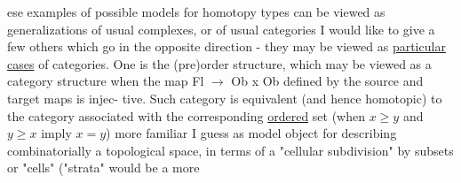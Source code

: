   ese examples of possible models for homotopy types can be viewed
as generalizations of usual complexes,  or of usual categories  I would
like to give a few others which go in the opposite direction  -  they
may be viewed as  \uline{particular cases} of categories.  One is the (pre)order
structure,  which may be viewed as a category structure when the
map    Fl $\longrightarrow$ Ob x Ob  defined by the source and target maps is injec-%
tive.  Such category is equivalent  (and hence homotopic) to the
category associated with the corresponding \uline{ordered} set (when $x\geqslant y$ and
$y\geqslant x$ imply $x=y$)   more familiar I guess as  model object for
describing combinatorially a topological space,  in terms of a "cellular
subdivision"  by  subsets or "cells" ("strata" would be a more
\margin{+}
